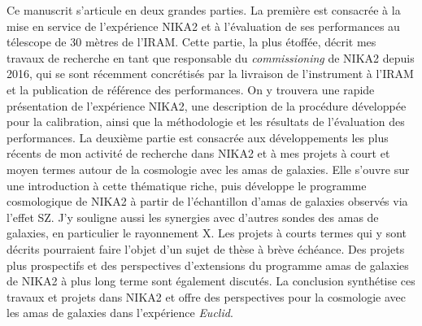 



Ce manuscrit s'articule en deux grandes parties. La première est
consacrée à la mise en service de l'expérience NIKA2 et à l'évaluation
de ses performances au télescope de 30 mètres de l'IRAM. Cette partie,
la plus étoffée, décrit mes travaux de recherche en tant que
responsable du \emph{commissioning} de NIKA2 depuis 2016, qui se sont
récemment concrétisés par la livraison de l'instrument à l'IRAM et la
publication de référence des performances. On y trouvera une rapide
présentation de l'expérience NIKA2, une description de la procédure
développée pour la calibration, ainsi que la méthodologie et les
résultats de l'évaluation des performances.
La deuxième partie est consacrée aux développements les plus récents
de mon activité de recherche dans NIKA2 et à mes projets à court et
moyen termes autour de la cosmologie avec les amas de galaxies. Elle
s'ouvre sur une introduction à cette thématique riche, puis développe
le programme cosmologique de NIKA2 à partir de l'échantillon d'amas de
galaxies observés via l'effet SZ. J'y souligne aussi les synergies avec
d'autres sondes des amas de galaxies, en particulier le rayonnement
X. Les projets à courts termes qui y sont décrits pourraient faire
l'objet d'un sujet de thèse à brève échéance. Des projets plus
prospectifs et des perspectives d'extensions du programme amas de
galaxies de NIKA2 à plus long terme sont également
discutés. La conclusion synthétise ces travaux et projets dans NIKA2
et offre des perspectives pour la cosmologie avec les amas de galaxies
dans l'expérience \emph{Euclid}.  






